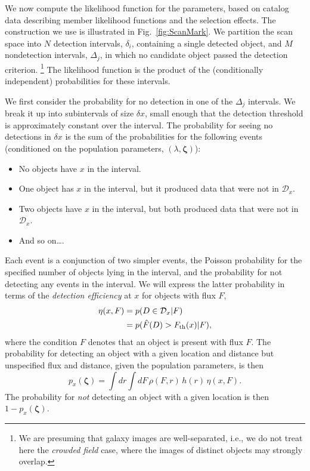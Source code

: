 \documentclass[12pt]{article}
\numberwithin{equation}{section}
\numberwithin{figure}{section}
\numberwithin{table}{section}
\newcommand{\rhopar}{\boldsymbol{\zeta}}
\newcommand{\dtxns}{\mathcal{D}}
\newcommand{\Fth}{F_{\rm th}}
\newcommand{\effic}{\eta}
\begin{document}
We now compute the likelihood function for the parameters, based on catalog data describing member likelihood functions and the selection effects.
The construction we use is illustrated in Fig.~\ref{fig:ScanMark}.
We partition the scan space into $N$ detection intervals, $\delta_i$, containing a single detected object, and $M$ nondetection intervals, $\Delta_j$, in which no candidate object passed the detection criterion.%
\footnote{We are presuming that galaxy images are well-separated, i.e., we do not treat here the \emph{crowded field} case, where the images of distinct objects may strongly overlap.}
The likelihood function is the product of the (conditionally independent) probabilities for these intervals.

We first consider the probability for no detection in one of the $\Delta_j$ intervals.
We break it up into subintervals of size $\delta x$, small enough that the detection threshold is approximately constant over the interval.
The probability for seeing no detections in $\delta x$ is the sum of the probabilities for the following events (conditioned on the population parameters, $(\lambda,\rhopar)$):
\begin{itemize}
\item No objects have $x$ in the interval.
\item One object has $x$ in the interval, but it produced data that were not in $\dtxns_x$.
\item Two objects have $x$ in the interval, but both produced data that were not in $\dtxns_x$.
\item And so on\ldots.
\end{itemize}
Each event is a conjunction of two simpler events, the Poisson probability for the specified number of objects lying in the interval, and the probability for not detecting any events in the interval.
We will express the latter probability in terms of the \emph{detection efficiency} at $x$ for objects with flux $F$,
\begin{align}\label{eq:eta-def}
\effic(x,F) 
  &= p(D\in\dtxns_x | F)\\
  &= p(\hat{F}(D) > \Fth(x) | F),
\end{align}
where the condition $F$ denotes that an object is present with flux $F$.
The probability for detecting an object with a given location and distance but unspecified flux and distance, given the population parameters, is then
\begin{equation}\label{eq:p-x}
p_x(\rhopar) = \int dr \int dF\,\rho(F,r)\, h(r)\, \effic(x,F).
\end{equation}
The probability for \emph{not} detecting an object with a given location is then $1-p_x(\rhopar)$.
\end{document}
